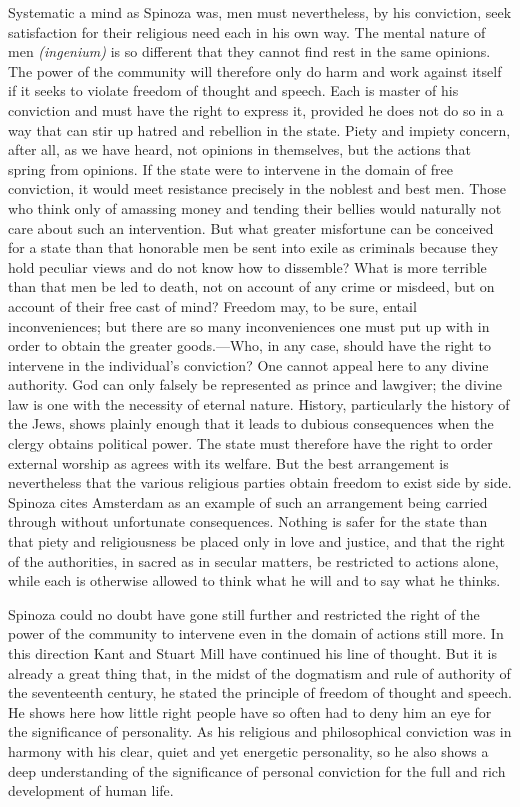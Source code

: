 \documentclass[12pt]{book}
\newcommand{\opage}[1]{\marginnote{\footnotesize\textit{[#1]}}}
\begin{document}
Systematic a mind as Spinoza was, men must nevertheless, by his conviction, seek
satisfaction for their religious need each in his own way. The mental nature of men
\textit{(ingenium)} is so different that they cannot find rest in the same opinions. The
power of the community will therefore only do harm and work against itself if it seeks to
violate freedom of thought and speech. Each is master of his conviction and must have the
right to express it, provided he does not do so in a way that can stir up hatred and
rebellion in the state. Piety and impiety concern, after all, as we have heard, not
opinions in themselves, but the actions that spring from opinions. If the state were to
intervene in the domain of free conviction, it would meet resistance precisely in the
noblest and best men. Those who think only of amassing money and tending their bellies
would naturally not care about such an intervention. But what greater misfortune can be
conceived for a state than that honorable men be sent into exile as criminals because
they hold peculiar views and do not know how to dissemble? What is more terrible than that
men be led to death, not on account of any crime or misdeed, but on account of their free
cast of mind? Freedom may, to be sure, entail inconveniences; but there are so many
inconveniences one must put up with in order to obtain the greater goods.---Who, in
\opage{163}any case, should have the right to intervene in the individual's conviction?
One cannot appeal here to any divine authority. God can only falsely be represented as
prince and lawgiver; the divine law is one with the necessity of eternal nature. History,
particularly the history of the Jews, shows plainly enough that it leads to dubious
consequences when the clergy obtains political power. The state must therefore have the
right to order external worship as agrees with its welfare. But the best arrangement is
nevertheless that the various religious parties obtain freedom to exist side by side.
Spinoza cites Amsterdam as an example of such an arrangement being carried through
without unfortunate consequences. Nothing is safer for the state than that piety and
religiousness be placed only in love and justice, and that the right of the authorities,
in sacred as in secular matters, be restricted to actions alone, while each is otherwise
allowed to think what he will and to say what he thinks.

Spinoza could no doubt have gone still further and restricted the right of the power of
the community to intervene even in the domain of actions still more. In this direction
Kant and Stuart Mill have continued his line of thought. But it is already a great thing
that, in the midst of the dogmatism and rule of authority of the seventeenth century, he
stated the principle of freedom of thought and speech. He shows here how little right
people have so often had to deny him an eye for the significance of personality. As his
religious and philosophical \opage{164}conviction was in harmony with his clear, quiet
and yet energetic personality, so he also shows a deep understanding of the significance
of personal conviction for the full and rich development of human life.
\end{document}
